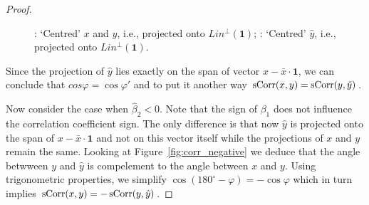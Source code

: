 \begin{proof}
\begin{figure}[h!]
\begin{center}
\caption{: `Centred' $x$ and $y$, i.e., projected onto $Lin^{\perp}(\mathbf{1})$; : `Centred' $\hat y$, i.e., projected onto $Lin^{\perp}(\mathbf{1})$.}
\end{center}
\end{figure}

Since the projection of $\hat y$ lies exactly on the span of vector $x - \bar x \cdot \mathbf{1}$, we can conclude that $cos \varphi = \cos \varphi '$ and to put it another way $\operatorname{sCorr}(x,y) = \operatorname{sCorr}(y, \hat y)$.

Now consider the case when $\hat \beta_2 < 0$.
Note that the sign of $\beta_1$ does not influence the correlation coefficient sign.
The only difference is that now $\hat y$ is projected onto the span of  $x - \bar x \cdot \mathbf{1}$ and not on this vector itself while the projections of $x$ and $y$ remain the same.
Looking at Figure~\ref{fig:corr_negative} we deduce that the angle betwween $y$ and $\hat y$ is compelement to the angle between $x$ and $y$.
Using trigonometric properties, we simplify $\cos(180^{\circ} - \varphi) = -\cos\varphi$ which in turn implies $\operatorname{sCorr}(x,y) = -\operatorname{sCorr}(y,\hat y)$.


\end{proof}
